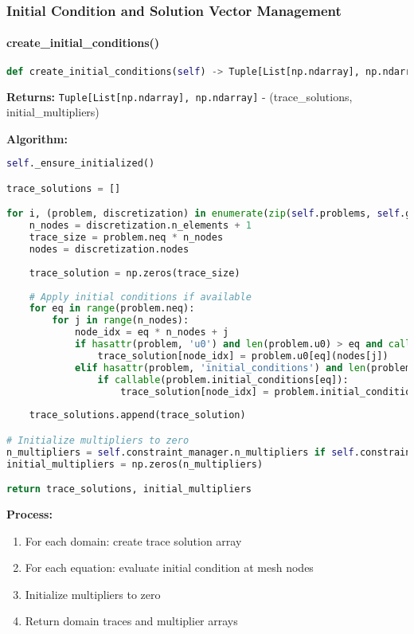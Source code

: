 \subsubsection{Initial Condition and Solution Vector Management}

\paragraph{create\_initial\_conditions()}
\begin{lstlisting}[language=Python, caption=Create Initial Conditions Method]
def create_initial_conditions(self) -> Tuple[List[np.ndarray], np.ndarray]
\end{lstlisting}

\textbf{Returns:} \texttt{Tuple[List[np.ndarray], np.ndarray]} - (trace\_solutions, initial\_multipliers)

\textbf{Algorithm:}
\begin{lstlisting}[language=Python, caption=Initial Conditions Algorithm]
self._ensure_initialized()

trace_solutions = []

for i, (problem, discretization) in enumerate(zip(self.problems, self.global_discretization.spatial_discretizations)):
    n_nodes = discretization.n_elements + 1
    trace_size = problem.neq * n_nodes
    nodes = discretization.nodes
    
    trace_solution = np.zeros(trace_size)
    
    # Apply initial conditions if available
    for eq in range(problem.neq):
        for j in range(n_nodes):
            node_idx = eq * n_nodes + j
            if hasattr(problem, 'u0') and len(problem.u0) > eq and callable(problem.u0[eq]):
                trace_solution[node_idx] = problem.u0[eq](nodes[j])
            elif hasattr(problem, 'initial_conditions') and len(problem.initial_conditions) > eq:
                if callable(problem.initial_conditions[eq]):
                    trace_solution[node_idx] = problem.initial_conditions[eq](nodes[j])
    
    trace_solutions.append(trace_solution)

# Initialize multipliers to zero
n_multipliers = self.constraint_manager.n_multipliers if self.constraint_manager else 0
initial_multipliers = np.zeros(n_multipliers)

return trace_solutions, initial_multipliers
\end{lstlisting}

\textbf{Process:}
\begin{enumerate}
    \item For each domain: create trace solution array
    \item For each equation: evaluate initial condition at mesh nodes
    \item Initialize multipliers to zero
    \item Return domain traces and multiplier arrays
\end{enumerate}

